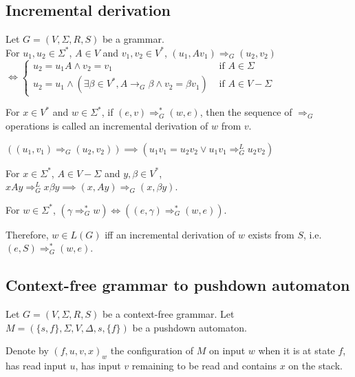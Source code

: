 \subsection{Incremental derivation}

\begin{definition}
Let $G = (V, \Sigma, R, S)$ be a grammar.\\
For $u_1, u_2 \in \Sigma^*$, $A \in V$ and $v_1, v_2 \in V^*$,
$(u_1, Av_1) \Rightarrow_G (u_2, v_2)$\\
$\iff \begin{cases}
u_2 = u_1A \wedge v_2 = v_1 & \textrm{ if } A \in \Sigma\\
u_2 = u_1 \wedge
(\exists \beta \in V^*, A \rightarrow_G \beta \wedge v_2 = \beta v_1)
& \textrm{ if } A \in V - \Sigma \end{cases}$
\end{definition}

For $x \in V^*$ and $w \in \Sigma^*$, if $(e, v) \Rightarrow_G^* (w, e)$,
then the sequence of $\Rightarrow_G$ operations
is called an incremental derivation of $w$ from $v$.

\begin{lemma}
$((u_1, v_1) \Rightarrow_G (u_2, v_2)) \implies (u_1v_1 = u_2v_2 \vee u_1v_1 \Rightarrow_G^L u_2v_2)$
\end{lemma}
\begin{lemma}
For $x \in \Sigma^*$, $A \in V-\Sigma$ and $y, \beta \in V^*$,\\
$xAy \Rightarrow_G^L x\beta y \implies (x, Ay) \Rightarrow_G (x, \beta y)$.
\end{lemma}
\begin{theorem}
For $w \in \Sigma^*$,
$(\gamma \Rightarrow_G^* w) \iff ((e, \gamma) \Rightarrow_G^* (w, e))$.
\end{theorem}
Therefore, $w \in L(G)$ iff an incremental derivation of $w$ exists from $S$,
i.e. $(e, S) \Rightarrow_G^* (w, e)$.

\subsection{Context-free grammar to pushdown automaton}

Let $G = (V, \Sigma, R, S)$ be a context-free grammar.
Let $M = (\{s, f\}, \Sigma, V, \Delta, s, \{f\})$ be a pushdown automaton.

Denote by $(f, u, v, x)_w$ the configuration of $M$ on input $w$ when it is at state $f$,
has read input $u$, has input $v$ remaining to be read and contains $x$ on the stack.

